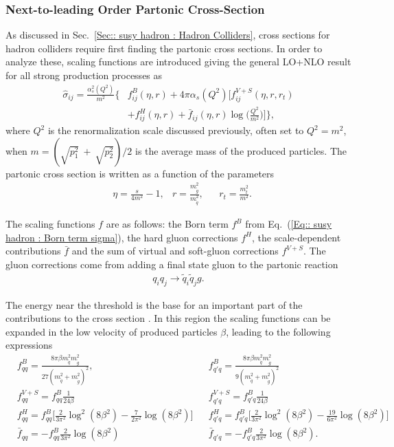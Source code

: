 \documentclass[twoside,english]{uiofysmaster}
\begin{document}
{\subsubsection{Next-to-leading Order Partonic Cross-Section}

As discussed in Sec.~\ref{Sec:: susy hadron : Hadron Colliders}, cross sections for hadron colliders require first finding the partonic cross sections. In order to analyze these, scaling functions are introduced \cite{Beenakker:1996ch} giving the general LO+NLO result for all strong production processes as
\begin{align}\label{Eq:: susy hadron : Partonic cross section LO+NLO}
\hat{\sigma}_{ij} = \frac{\alpha_s^2(Q^2)}{m^2} \Big\{ &f^B_{ij}(\eta, r) + 4 \pi \alpha_s (Q^2) \Bigg[ f_{ij}^{V+S}(\eta, r, r_t) \nonumber \\ & + f_{ij}^H (\eta, r) + \bar{f}_{ij} (\eta, r) \log \Bigg( \frac{Q^2}{m^2}\Bigg) \Bigg] \Big\},
\end{align}
where $Q^2$ is the renormalization scale discussed previously, often set to $Q^2 = m^2$, when $m = (\sqrt{p_1^2}~+~\sqrt{p_2^2})/2$ is the average mass of the produced particles. The partonic cross section is written as a function of the parameters
\begin{align}
&\eta = \frac{s}{4m^2} -1, &r= \frac{m_{\widetilde{g}}^2}{m_{\widetilde{q}}^2}, &&r_t = \frac{m_t^2}{m^2}.
\end{align} 

The scaling functions $f$ are as follows: the Born term $f^B$ from Eq.~(\ref{Eq:: susy hadron : Born term sigma}), the hard gluon corrections $f^H$, the scale-dependent contributions $\bar{f}$ and the sum of virtual and soft-gluon corrections $f^{V+S}$. The gluon corrections come from adding a final state gluon to the partonic reaction
\begin{align}
q_i q_j \rightarrow \widetilde{q}_i  \widetilde{q}_j g.
\end{align}

The energy near the threshold is the base for an important part of the contributions to the cross section \cite{Beenakker:1996ch}. In this region the scaling functions can be expanded in the low velocity of produced particles $\beta$, leading to the following expressions \cite{Beenakker:1996ch}
\begin{align}
&f_{qq}^B = \frac{8 \pi \beta m_{\widetilde{q}}^2 m_{\widetilde{g}}^2}{27(m_{\widetilde{q}}^2 + m_{\widetilde{g}}^2)^2}, &&f_{q'q}^B = \frac{8 \pi \beta m_{\widetilde{q}}^2 m_{\widetilde{g}}^2}{9(m_{\widetilde{q}}^2 + m_{\widetilde{g}}^2)^2} \nonumber \\
& f_{qq}^{V+S} = f_{qq}^B \frac{1}{24 \beta} && f_{q'q}^{V+S} = f_{q'q}^B \frac{1}{24 \beta} \nonumber \\
&f_{qq}^H = f_{qq}^B \Big[\frac{2}{3 \pi^2} \log^2(8 \beta^2) - \frac{7}{2 \pi^2} \log (8 \beta^2) \Big] &&f_{q'q}^H = f_{q'q}^B \Big[\frac{2}{3 \pi^2} \log^2(8 \beta^2) - \frac{19}{6 \pi^2} \log (8 \beta^2) \Big] \nonumber \\
& \bar{f}_{qq} = - f_{qq}^B \frac{2}{3 \pi^2} \log (8 \beta^2) &&\bar{f}_{q'q} = - f_{q'q}^B \frac{2}{3 \pi^2} \log (8 \beta^2).\label{Eq:: susy hadron : Scaling functions near threshold}
\end{align}

}
\end{document}
